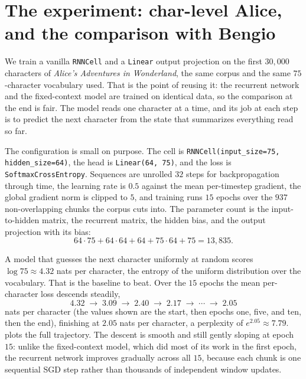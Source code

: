 
\section{The experiment: char-level Alice, and the comparison with
  Bengio}\label{sec:rnn-alice}

We train a vanilla \texttt{RNNCell} and a \texttt{Linear} output projection
on the first $30{,}000$ characters of \emph{Alice's Adventures in
Wonderland}, the same corpus and the same $75$-character vocabulary
 used. That is the point of reusing it: the
recurrent network and the fixed-context model are trained on identical data,
so the comparison at the end is fair. The model reads one character at a
time, and its job at each step is to predict the next character from the
state that summarizes everything read so far.

The configuration is small on purpose. The cell is
\texttt{RNNCell(input\_size=75, hidden\_size=64)}, the head is
\texttt{Linear(64, 75)}, and the loss is \texttt{SoftmaxCrossEntropy}.
Sequences are unrolled $32$ steps for backpropagation through time, the
learning rate is $0.5$ against the mean per-timestep gradient, the global
gradient norm is clipped to $5$, and training runs $15$ epochs over the
$937$ non-overlapping chunks the corpus cuts into. The parameter count is
the input-to-hidden matrix, the recurrent matrix, the hidden bias, and the
output projection with its bias:
\[
  64 \cdot 75 + 64 \cdot 64 + 64 + 75 \cdot 64 + 75 = 13{,}835.
\]

A model that guesses the next character uniformly at random scores
$\log 75 \approx 4.32$ nats per character, the entropy of the uniform
distribution over the vocabulary. That is the baseline to beat. Over the
$15$ epochs the mean per-character loss descends steadily,
\[
  4.32 \;\to\; 3.09 \;\to\; 2.40 \;\to\; 2.17 \;\to\; \cdots \;\to\; 2.05
\]
nats per character (the values shown are the start, then epochs one, five,
and ten, then the end), finishing at $2.05$ nats per character, a perplexity
of $e^{2.05} \approx 7.79$.  plots the full
trajectory. The descent is smooth and still gently sloping at epoch $15$:
unlike the fixed-context model, which did most of its work in the first
epoch, the recurrent network improves gradually across all $15$, because
each chunk is one sequential SGD step rather than thousands of independent
window updates.


